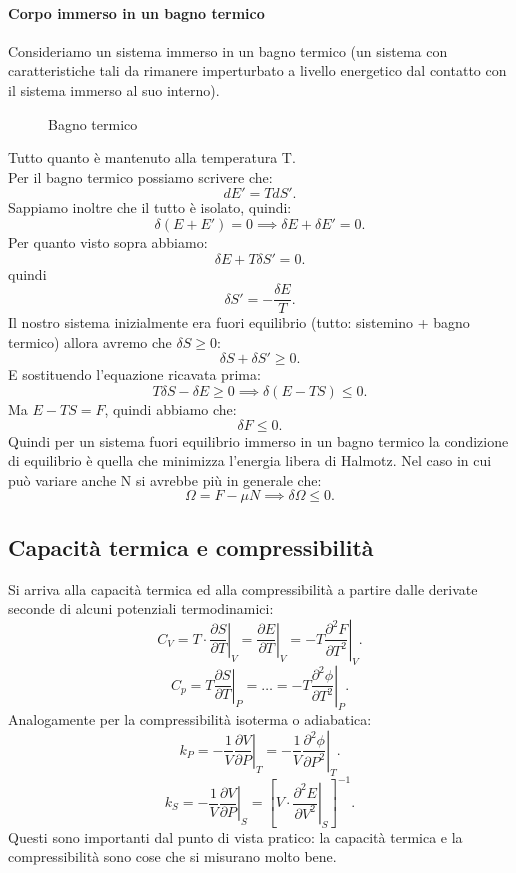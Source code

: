 \paragraph{Corpo immerso in un bagno termico}%
Consideriamo un sistema immerso in un bagno termico (un sistema con caratteristiche tali da rimanere imperturbato a livello energetico dal contatto con il sistema immerso al suo interno).
\begin{figure}[H]
    \centering
    \caption{Bagno termico}
    \label{fig:bagno-termico}
\end{figure}
\noindent
Tutto quanto è mantenuto alla temperatura T.\\
Per il bagno termico possiamo scrivere che:
\[
	dE' = TdS'
.\] 
Sappiamo inoltre che il tutto è isolato, quindi:
\[
	\delta\left( E+E' \right) = 0 \implies
	\delta E + \delta E' = 0
.\]
Per quanto visto sopra abbiamo:
\[
	\delta E + T\delta S' = 0 
.\] 
quindi \[
	\delta S' = - \frac{\delta E}{T}
.\] 
Il nostro sistema inizialmente era fuori equilibrio (tutto: sistemino + bagno termico) allora avremo che $\delta S \ge 0$:
\[
	\delta S + \delta S' \ge  0
.\] 
E sostituendo l'equazione ricavata prima:
\[
	T\delta S - \delta E \ge 0 \implies
	\delta \left( E- TS \right) \le 0
.\] 
Ma $E-TS = F$, quindi abbiamo che: 
\[
	\delta F \le 0
.\] 
Quindi per un sistema fuori equilibrio immerso in un bagno termico la condizione di equilibrio è quella che minimizza l'energia libera di Halmotz.
Nel caso in cui può variare anche N si avrebbe più in generale che:
\[
	\Omega = F - \mu N \implies \delta \Omega \le  0
.\] 

\subsection{Capacità termica e compressibilità}%
Si arriva alla capacità termica ed alla compressibilità a partire dalle derivate seconde di alcuni potenziali termodinamici:
\[
	C_{V} = T\cdot \left.\frac{\partial S}{\partial T} \right|_{V} = \left.\frac{\partial E}{\partial T} \right|_{V}=
			- T \left.\frac{\partial ^2 F}{\partial T^2 } \right|_{V}
.\] \label{eq:capacita-termica}
\[
	C_{p} = T \left.\frac{\partial S}{\partial T} \right|_{P} = \ldots = - T \left.\frac{\partial ^2 \phi}{\partial T^2} \right|_{P}
.\] 
Analogamente per la compressibilità isoterma o adiabatica:
\[
	k_{P}= -\frac{1}{V} \left.\frac{\partial V}{\partial P} \right|_{T} =
	-\frac{1}{V} \left.\frac{\partial ^2 \phi}{\partial P^2} \right|_{T}
.\] 
\[
	k_{S} = -\frac{1}{V}\left.\frac{\partial V}{\partial P} \right|_{S}=
	\left[ V\cdot \left.\frac{\partial^2 E}{\partial V^2} \right|_{S} \right] ^{-1}
.\] 
Questi sono importanti dal punto di vista pratico: la capacità termica e la compressibilità sono cose che si misurano molto bene.
